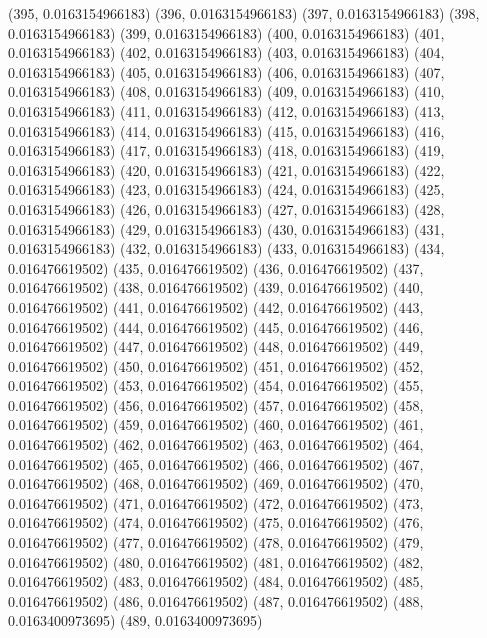 {					(395, 0.0163154966183)
					(396, 0.0163154966183)
					(397, 0.0163154966183)
					(398, 0.0163154966183)
					(399, 0.0163154966183)
					(400, 0.0163154966183)
					(401, 0.0163154966183)
					(402, 0.0163154966183)
					(403, 0.0163154966183)
					(404, 0.0163154966183)
					(405, 0.0163154966183)
					(406, 0.0163154966183)
					(407, 0.0163154966183)
					(408, 0.0163154966183)
					(409, 0.0163154966183)
					(410, 0.0163154966183)
					(411, 0.0163154966183)
					(412, 0.0163154966183)
					(413, 0.0163154966183)
					(414, 0.0163154966183)
					(415, 0.0163154966183)
					(416, 0.0163154966183)
					(417, 0.0163154966183)
					(418, 0.0163154966183)
					(419, 0.0163154966183)
					(420, 0.0163154966183)
					(421, 0.0163154966183)
					(422, 0.0163154966183)
					(423, 0.0163154966183)
					(424, 0.0163154966183)
					(425, 0.0163154966183)
					(426, 0.0163154966183)
					(427, 0.0163154966183)
					(428, 0.0163154966183)
					(429, 0.0163154966183)
					(430, 0.0163154966183)
					(431, 0.0163154966183)
					(432, 0.0163154966183)
					(433, 0.0163154966183)
					(434, 0.016476619502)
					(435, 0.016476619502)
					(436, 0.016476619502)
					(437, 0.016476619502)
					(438, 0.016476619502)
					(439, 0.016476619502)
					(440, 0.016476619502)
					(441, 0.016476619502)
					(442, 0.016476619502)
					(443, 0.016476619502)
					(444, 0.016476619502)
					(445, 0.016476619502)
					(446, 0.016476619502)
					(447, 0.016476619502)
					(448, 0.016476619502)
					(449, 0.016476619502)
					(450, 0.016476619502)
					(451, 0.016476619502)
					(452, 0.016476619502)
					(453, 0.016476619502)
					(454, 0.016476619502)
					(455, 0.016476619502)
					(456, 0.016476619502)
					(457, 0.016476619502)
					(458, 0.016476619502)
					(459, 0.016476619502)
					(460, 0.016476619502)
					(461, 0.016476619502)
					(462, 0.016476619502)
					(463, 0.016476619502)
					(464, 0.016476619502)
					(465, 0.016476619502)
					(466, 0.016476619502)
					(467, 0.016476619502)
					(468, 0.016476619502)
					(469, 0.016476619502)
					(470, 0.016476619502)
					(471, 0.016476619502)
					(472, 0.016476619502)
					(473, 0.016476619502)
					(474, 0.016476619502)
					(475, 0.016476619502)
					(476, 0.016476619502)
					(477, 0.016476619502)
					(478, 0.016476619502)
					(479, 0.016476619502)
					(480, 0.016476619502)
					(481, 0.016476619502)
					(482, 0.016476619502)
					(483, 0.016476619502)
					(484, 0.016476619502)
					(485, 0.016476619502)
					(486, 0.016476619502)
					(487, 0.016476619502)
					(488, 0.0163400973695)
					(489, 0.0163400973695)
}
